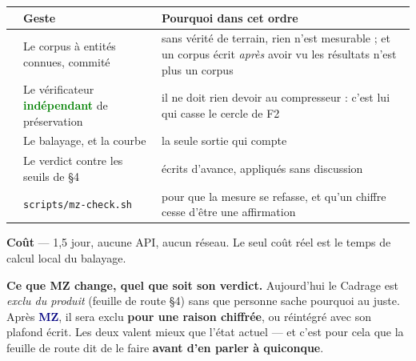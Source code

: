 \documentclass[10pt]{article}
\newcommand{\best}[1]{\textcolor{green}{\textbf{#1}}}
\newcommand{\code}[1]{\texttt{\small #1}}
\newcommand{\mm}[1]{\textbf{\textcolor{navy}{#1}}}
\begin{document}
\begin{center}\small
\renewcommand{\arraystretch}{1.22}
\begin{tabular}{@{}>{\raggedright\arraybackslash}p{1.0cm} >{\raggedright\arraybackslash}p{7.4cm} >{\raggedright\arraybackslash}p{7.4cm}@{}}
\toprule
& \textbf{Geste} & \textbf{Pourquoi dans cet ordre} \\
\midrule
1 & Le corpus à entités connues, commité & sans vérité de terrain, rien n'est mesurable ; et un corpus écrit \emph{après} avoir vu les résultats n'est plus un corpus \\
2 & Le vérificateur \best{indépendant} de préservation & il ne doit rien devoir au compresseur : c'est lui qui casse le cercle de F2 \\
3 & Le balayage, et la courbe & la seule sortie qui compte \\
4 & Le verdict contre les seuils de §4 & écrits d'avance, appliqués sans discussion \\
5 & \code{scripts/mz-check.sh} & pour que la mesure se refasse, et qu'un chiffre cesse d'être une affirmation \\
\bottomrule
\end{tabular}
\end{center}

\textbf{Coût} --- 1,5 jour, aucune API, aucun réseau. Le seul coût réel est le temps de calcul local
du balayage.

\begin{these}
\small \textbf{Ce que MZ change, quel que soit son verdict.} Aujourd'hui le Cadrage est
\emph{exclu du produit} (feuille de route §4) sans que personne sache pourquoi au juste. Après
\mm{MZ}, il sera exclu \textbf{pour une raison chiffrée}, ou réintégré avec son plafond écrit. Les
deux valent mieux que l'état actuel --- et c'est pour cela que la feuille de route dit de le faire
\textbf{avant d'en parler à quiconque}.
\end{these}
\end{document}
